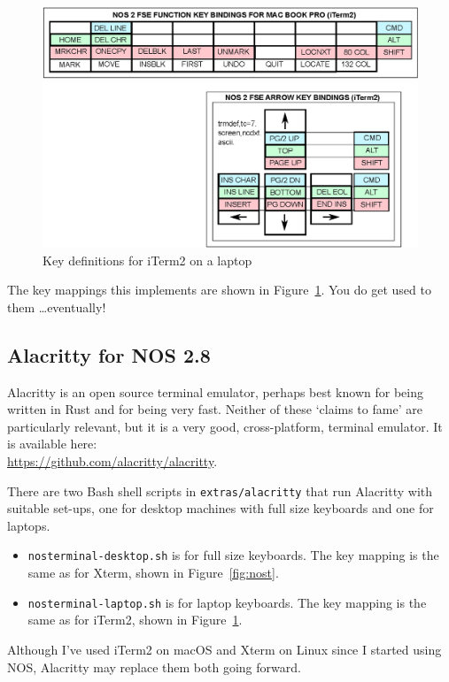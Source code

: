 \documentclass[a4paper,twoside,11pt]{article}
\newcommand{\newpara}{\par\vspace{4mm}\noindent}
\begin{document}
\begin{figure}
	\centering
	\includegraphics[scale=0.9]{../extras/iTerm2/fse-mac-iterm2.eps}
	\caption{Key definitions for iTerm2 on a laptop}
	\label{fig:it2map}
\end{figure}

\newpara
The key mappings this implements are shown in Figure~\ref{fig:it2map}. You do get used to them \ldots eventually!

\subsection{Alacritty for NOS 2.8}
Alacritty is an open source terminal emulator, perhaps best known for being written in Rust and for being very fast. Neither of these
`claims to fame' are particularly relevant, but it is a very good, cross-platform, terminal emulator. It is available here:\\
\url{https://github.com/alacritty/alacritty}.

\newpara
There are two Bash shell scripts in \texttt{extras/alacritty} that run Alacritty with suitable set-ups, one for desktop machines with full
size keyboards and one for laptops. 
\begin{itemize}
\item \texttt{nosterminal-desktop.sh} is for full size keyboards. The key mapping is the same as for Xterm, shown in Figure~\ref{fig:nost}.
\item \texttt{nosterminal-laptop.sh} is for laptop keyboards. The key mapping is the same as for iTerm2, shown in Figure~\ref{fig:it2map}.
\end{itemize}

\newpara
Although I've used iTerm2 on macOS and Xterm on Linux since I started using NOS, Alacritty may replace them both going forward.
\end{document}
